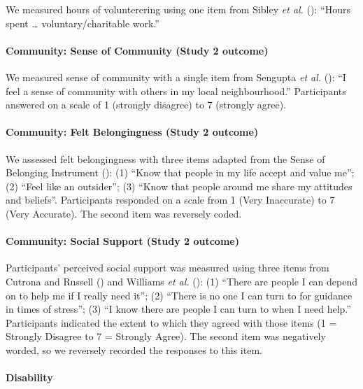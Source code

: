 \documentclass[
  singlecolumn]{article}
\let\oldparagraph\paragraph
\renewcommand{\paragraph}[1]{\oldparagraph{#1}\mbox{}}
\begin{document}
We measured hours of volunterering using one item from Sibley \emph{et
al.} (): ``Hours spent \ldots{}
voluntary/charitable work.''

\paragraph{Community: Sense of Community (Study 2
outcome)}\label{community-sense-of-community-study-2-outcome}

We measured sense of community with a single item from Sengupta \emph{et
al.} (): ``I feel a sense of community
with others in my local neighbourhood.'' Participants answered on a
scale of 1 (strongly disagree) to 7 (strongly agree).

\paragraph{Community: Felt Belongingness (Study 2
outcome)}\label{community-felt-belongingness-study-2-outcome}

We assessed felt belongingness with three items adapted from the Sense
of Belonging Instrument (): (1) ``Know that people in my life accept and value me''; (2)
``Feel like an outsider''; (3) ``Know that people around me share my
attitudes and beliefs''. Participants responded on a scale from 1 (Very
Inaccurate) to 7 (Very Accurate). The second item was reversely coded.

\paragraph{Community: Social Support (Study 2
outcome)}\label{community-social-support-study-2-outcome}

Participants' perceived social support was measured using three items
from Cutrona and Russell () and Williams
\emph{et al.} (): (1)
``There are people I can depend on to help me if I really need it''; (2)
``There is no one I can turn to for guidance in times of stress''; (3)
``I know there are people I can turn to when I need help.'' Participants
indicated the extent to which they agreed with those items (1 = Strongly
Disagree to 7 = Strongly Agree). The second item was negatively worded,
so we reversely recorded the responses to this item.

\paragraph{Disability}\label{disability}
\end{document}
